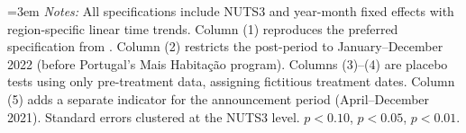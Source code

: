 \begin{table}[htbp]
\centering
\caption{Robustness Checks and Placebo Tests}
\label{tab:robustness}
\vspace{0.5em}
\begin{minipage}{\textwidth}\emergencystretch=3em
\footnotesize
\textit{Notes:} All specifications include NUTS3 and year-month fixed effects with region-specific linear time trends. Column (1) reproduces the preferred specification from . Column (2) restricts the post-period to January--December 2022 (before Portugal's Mais Habita\c{c}\~{a}o program). Columns (3)--(4) are placebo tests using only pre-treatment data, assigning fictitious treatment dates. Column (5) adds a separate indicator for the announcement period (April--December 2021). Standard errors clustered at the NUTS3 level. \sym{*} $p<0.10$, \sym{**} $p<0.05$, \sym{***} $p<0.01$.
\end{minipage}
\end{table}
